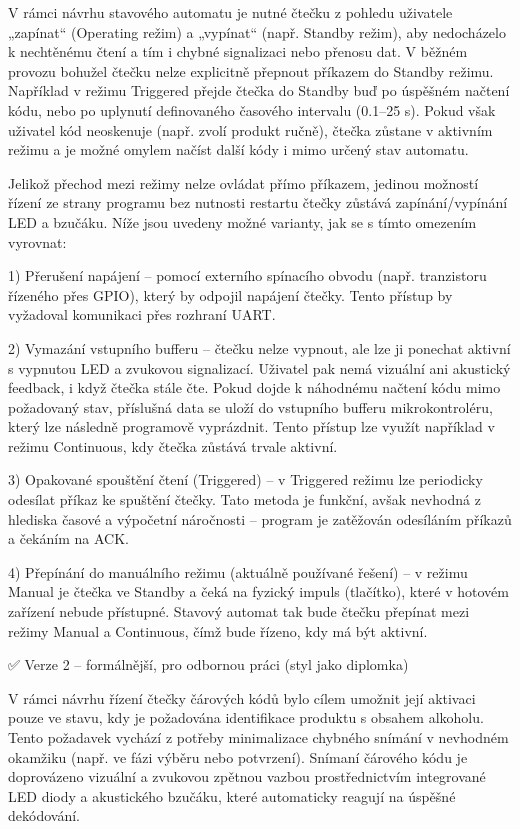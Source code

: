     V rámci návrhu stavového automatu je nutné čtečku z pohledu uživatele „zapínat“ (Operating režim) a „vypínat“ (např. Standby režim), aby nedocházelo k nechtěnému čtení a tím i chybné signalizaci nebo přenosu dat. V běžném provozu bohužel čtečku nelze explicitně přepnout příkazem do Standby režimu. Například v režimu Triggered přejde čtečka do Standby buď po úspěšném načtení kódu, nebo po uplynutí definovaného časového intervalu (0.1–25 s). Pokud však uživatel kód neoskenuje (např. zvolí produkt ručně), čtečka zůstane v aktivním režimu a je možné omylem načíst další kódy i mimo určený stav automatu.

    Jelikož přechod mezi režimy nelze ovládat přímo příkazem, jedinou možností řízení ze strany programu bez nutnosti restartu čtečky zůstává zapínání/vypínání LED a bzučáku. Níže jsou uvedeny možné varianty, jak se s tímto omezením vyrovnat:

    1) Přerušení napájení – pomocí externího spínacího obvodu (např. tranzistoru řízeného přes GPIO), který by odpojil napájení čtečky. Tento přístup by vyžadoval komunikaci přes rozhraní UART.

    2) Vymazání vstupního bufferu – čtečku nelze vypnout, ale lze ji ponechat aktivní s vypnutou LED a zvukovou signalizací. Uživatel pak nemá vizuální ani akustický feedback, i když čtečka stále čte. Pokud dojde k náhodnému načtení kódu mimo požadovaný stav, příslušná data se uloží do vstupního bufferu mikrokontroléru, který lze následně programově vyprázdnit. Tento přístup lze využít například v režimu Continuous, kdy čtečka zůstává trvale aktivní.

    3) Opakované spouštění čtení (Triggered) – v Triggered režimu lze periodicky odesílat příkaz ke spuštění čtečky. Tato metoda je funkční, avšak nevhodná z hlediska časové a výpočetní náročnosti – program je zatěžován odesíláním příkazů a čekáním na ACK.

    4) Přepínání do manuálního režimu (aktuálně používané řešení) – v režimu Manual je čtečka ve Standby a čeká na fyzický impuls (tlačítko), které v hotovém zařízení nebude přístupné. Stavový automat tak bude čtečku přepínat mezi režimy Manual a Continuous, čímž bude řízeno, kdy má být aktivní.

✅ Verze 2 – formálnější, pro odbornou práci (styl jako diplomka)

    V rámci návrhu řízení čtečky čárových kódů bylo cílem umožnit její aktivaci pouze ve stavu, kdy je požadována identifikace produktu s obsahem alkoholu. Tento požadavek vychází z potřeby minimalizace chybného snímání v nevhodném okamžiku (např. ve fázi výběru nebo potvrzení). Snímaní čárového kódu je doprovázeno vizuální a zvukovou zpětnou vazbou prostřednictvím integrované LED diody a akustického bzučáku, které automaticky reagují na úspěšné dekódování.

